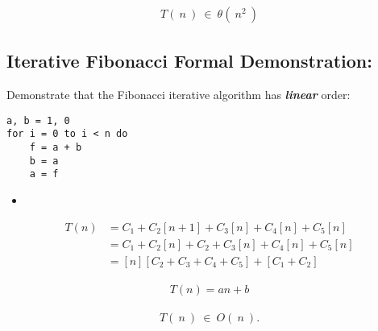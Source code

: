 \documentclass[10pt,a4paper]{article}
\begin{document}
{\bfseries\itshape\color{CadetBlue}{Finally:}} \hfill 

\begin{ceqn}
\begin{align}
T(\ n\ )\ \in\ \theta (\ n^{2}\ )
\end{align}
\end{ceqn}

\pagebreak

\subsection{Iterative Fibonacci Formal Demonstration:}

Demonstrate that the Fibonacci iterative algorithm has {\bfseries\itshape linear} order:  \hfill \break

\begin{lstlisting}
a, b = 1, 0
for i = 0 to i < n do
	f = a + b
	b = a
	a = f
\end{lstlisting}

\begin{itemize}
\item {\bfseries\itshape\color{Maroon}{Demonstration:}} \hfill
\end{itemize}

\begin{ceqn}
\begin{align}
T( n ) &= C_{1} + C_{2}[ n + 1 ] + C_{3}[ n ] + C_{4}[ n ] + C_{5}[ n ] \\
&= C_{1} + C_{2}[ n ] + C_{2} + C_{3}[ n ] + C_{4}[ n ] + C_{5}[ n ] \\
&= [ n ] [ C_{2} + C_{3} + C_{4} + C_{5} ] + [ C_{1} + C_{2} ]
\end{align}
\end{ceqn}

{\bfseries\itshape{}} \hfill

{\bfseries\itshape\color{CadetBlue}{Then:}}

\begin{ceqn}
\begin{align}
T( n ) = an + b
\end{align}
\end{ceqn} \hfill

{\bfseries\itshape\color{CadetBlue}{Finally:}}

\begin{ceqn}
\begin{align}
T(\ n\ )\ \in\ O(\ n\  ).
\end{align}
\end{ceqn}
\end{document}
